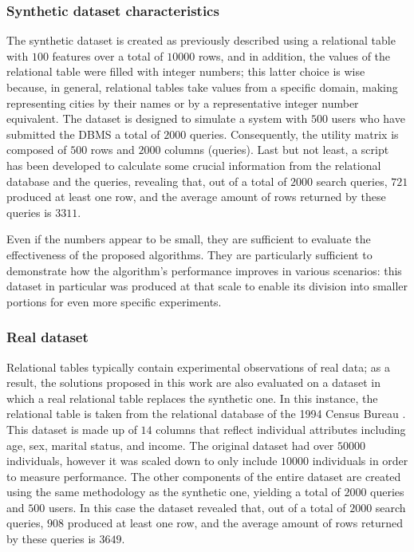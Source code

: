 \subsubsection{Synthetic dataset characteristics}
The synthetic dataset is created as previously described using a relational table with $100$ features over a total of $10000$ rows, and in addition, the values of the relational table were filled with integer numbers; this latter choice is wise because, in general, relational tables take values from a specific domain, making representing cities by their names or by a representative integer number equivalent. The dataset is designed to simulate a system with $500$ users who have submitted the DBMS a total of $2000$ queries. Consequently, the utility matrix is composed of $500$ rows and $2000$ columns (queries). Last but not least, a script has been developed to calculate some crucial information from the relational database and the queries, revealing that, out of a total of $2000$ search queries, $721$ produced at least one row, and the average amount of rows returned by these queries is $3311$. 


Even if the numbers appear to be small, they are sufficient to evaluate the effectiveness of the proposed algorithms. They are particularly sufficient to demonstrate how the algorithm's performance improves in various scenarios: this dataset in particular was produced at that scale to enable its division into smaller portions for even more specific experiments. 

\subsubsection{Real dataset}
Relational tables typically contain experimental observations of real data; as a result, the solutions proposed in this work are also evaluated on a dataset in which a real relational table replaces the synthetic one. In this instance, the relational table is taken from the relational database of the 1994 Census Bureau \cite{relational_db}. This dataset is made up of $14$ columns that reflect individual attributes including age, sex, marital status, and income. The original dataset had over $50000$ individuals, however it was scaled down to only include $10000$ individuals in order to measure performance. The other components of the entire dataset are created using the same methodology as the synthetic one, yielding a total of $2000$ queries and $500$ users. In this case the dataset revealed that, out of a total of $2000$ search queries, $908$ produced at least one row, and the average amount of rows returned by these queries is $3649$. 


